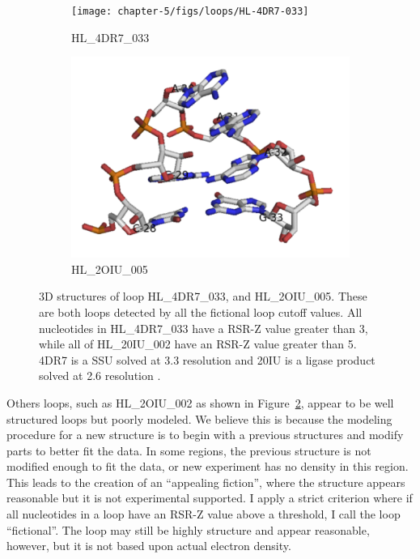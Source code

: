 \begin{figure}
  \begin{subfigure}[b]{0.45\textwidth}
    \texttt{[image: chapter-5/figs/loops/HL-4DR7-033]}
    \caption{HL\_4DR7\_033}
    \label{fig:hl-4dr7-033}
  \end{subfigure}
  \begin{subfigure}[b]{0.45\textwidth}
    \includegraphics[width=\textwidth]{chapter-5/figs/loops/HL-2OIU-005}
    \caption{HL\_2OIU\_005}
    \label{fig:hl-2oiu-002}
  \end{subfigure}
  \caption{3D structures of loop HL\_4DR7\_033, and HL\_2OIU\_005. These are
    both loops detected by all the fictional loop cutoff values. All nucleotides
    in HL\_4DR7\_033 have a RSR-Z value greater than 3, while all of HL\_20IU\_002
    have an RSR-Z value greater than 5. 4DR7 is a \TT{} SSU solved at
    3.3\angstrom{} resolution \cite{Demirci2013} and 20IU is a ligase product
      solved at 2.6\angstrom{} resolution \cite{Robertson2007}.}
  \label{fig:fictional-loops}
\end{figure}

Others loops, such as HL\_2OIU\_002 as shown in Figure~\ref{fig:hl-2oiu-002},
appear to be well structured loops but poorly modeled. We believe this is
because the modeling procedure for a new structure is to begin with a previous
structures and modify parts to better fit the data. In some regions, the
previous structure is not modified enough to fit the data, or new experiment has
no density in this region. This leads to the creation of an ``appealing fiction'',
where the structure appears reasonable but it is not experimental supported. I 
apply a strict criterion where if all nucleotides in a loop have an RSR-Z value
above a threshold, I call the loop ``fictional''. The loop may still be highly
structure and appear reasonable, however, but it is not based upon actual
electron density.

